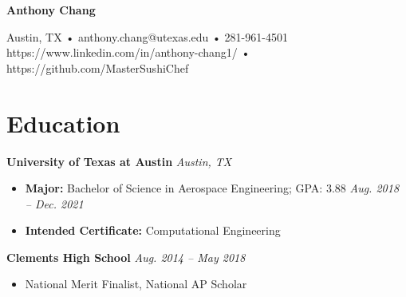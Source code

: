 \documentclass[letterpaper,11pt]{article}
\begin{document}
\begin{center}
\textbf{\LARGE{Anthony Chang}}

Austin, TX • anthony.chang@utexas.edu • 281-961-4501\\
https://www.linkedin.com/in/anthony-chang1/ • https://github.com/MasterSushiChef
\end{center}

\section{Education}
\textbf{University of Texas at Austin} \hfill \textit{Austin, TX}\\
\begin{itemize}[noitemsep, topsep=0pt]
  \item \textbf{Major:} Bachelor of Science in Aerospace Engineering; GPA: 3.88 \hfill \textit{Aug. 2018 -- Dec. 2021}\\
  \item \textbf{Intended Certificate:} Computational Engineering\\
\end{itemize}
\textbf{\small{Clements High School}} \hfill \textit{Aug. 2014 -- May 2018}
\begin{itemize}[noitemsep, topsep=0pt]
  \item \small{National Merit Finalist, National AP Scholar}
\end{itemize}
\end{document}
